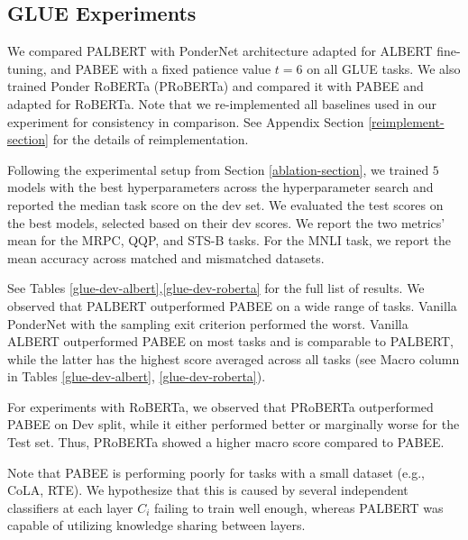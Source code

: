 \documentclass{article}
\begin{document}
\subsection{GLUE Experiments}
\label{glue-section}

We compared PALBERT with PonderNet architecture adapted for ALBERT fine-tuning, and PABEE with a fixed patience value $t = 6$ on all GLUE tasks. We also trained Ponder RoBERTa (PRoBERTa) and compared it with PABEE and adapted for RoBERTa. Note that we re-implemented all baselines used in our experiment for consistency in comparison. See Appendix Section \ref{reimplement-section} for the details of reimplementation.


Following the experimental setup from Section \ref{ablation-section}, we trained $5$ models with the best hyperparameters across the hyperparameter search and reported the median task score on the dev set. We evaluated the test scores on the best models, selected based on their dev scores. We report the two metrics' mean for the MRPC, QQP, and STS-B tasks. For the MNLI task, we report the mean accuracy across matched and mismatched datasets. 

See Tables \ref{glue-dev-albert},\ref{glue-dev-roberta} for the full list of results. We observed that PALBERT outperformed PABEE on a wide range of tasks. Vanilla PonderNet with the sampling exit criterion performed the worst. Vanilla ALBERT outperformed PABEE on most tasks and is comparable to PALBERT, while the latter has the highest score averaged across all tasks (see Macro column in Tables \ref{glue-dev-albert}, \ref{glue-dev-roberta}). 

For experiments with RoBERTa, we observed that PRoBERTa outperformed PABEE on Dev split, while it either performed better or marginally worse for the Test set. Thus, PRoBERTa showed a higher macro score compared to PABEE.

Note that PABEE is performing poorly for tasks with a small dataset (e.g., CoLA, RTE). We hypothesize that this is caused by several independent classifiers at each layer $C_i$ failing to train well enough, whereas PALBERT was capable of utilizing knowledge sharing between layers.



\begin{table}[htb!]
\centering
{}
\caption{Hyperparameter search ranges used in all of our experiments. }
  \label{ablation-hyp-range}
\end{table}
\end{document}
